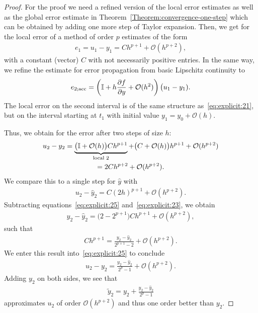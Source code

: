 \begin{proof}
  For the proof we need a refined version of the local error estimates
  as well as the global error estimate in
  Theorem~\eqref{Theorem:convergence-one-step} which can be obtained by
  adding one more step of Taylor expansion. Then, we get for the local
  error of a method of order $p$ estimates of the form
  \begin{gather}
    \label{eq:explicit:21}
    e_1 = u_1 - y_1 = C h^{p+1} + \mathcal O(h^{p+2}),
  \end{gather}
  with a constant (vector) $C$ with not necessarily positive
  entries. In the same way, we refine the estimate for error
  propagation from basic Lipschitz continuity to
  \begin{gather}
    \label{eq:explicit:22}
    e_{2;\text{acc}} = \left( \mathbb I + h \frac{\partial f}{\partial y} +
      \mathcal O(h^2)\right) \bigl(u_1-y_1).
  \end{gather}
  The local error on the second interval is of the same structure
  as~\eqref{eq:explicit:21}, but on the interval starting at $t_1$
  with initial value $y_1 = y_0 + \mathcal O(h)$.

  Thus, we obtain for the error after two steps of size $h$:
  \begin{multline}
    \label{eq:explicit:25}
    u_2-y_2
    = \underbrace{\bigl(\mathbb I + \mathcal O(h)\bigr) C
      h^{p+1}}_{\text{local 2}}
    + \bigl(C+\mathcal O(h)\bigr) h^{p+1} + \mathcal
      O(h^{p+2})
    \\  = 2C h^{p+2} + \mathcal O(h^{p+2}).
  \end{multline}
  We compare this to a single step for $\hat y$ with
  \begin{gather}
    \label{eq:explicit:23}
    u_2 - \hat y_2 = C (2h)^{p+1} + \mathcal O(h^{p+2}).
  \end{gather}
  Subtracting equations~\eqref{eq:explicit:25}
  and~\eqref{eq:explicit:23}, we obtain
  \begin{gather*}
    y_2 - \hat y_2 = \bigl(2-2^{p+1}\bigr)C h^{p+1} + \mathcal O(h^{p+2}),
  \end{gather*}
  such that
  \begin{gather}
    \label{eq:explicit:26}
    C h^{p+1} = \frac{y_2 - \hat y_2}{2^{p+1}-2} + \mathcal O(h^{p+2}).
  \end{gather}
  We enter this result into~\eqref{eq:explicit:25} to conclude
  \begin{gather}
    \label{eq:explicit:27}
    u_2 - y_2 = \frac{y_2 - \hat y_2}{2^{p}-1} + \mathcal O(h^{p+2}).
  \end{gather}
  Adding $y_2$ on both sides, we see that
  \begin{gather}
    \label{eq:explicit:28}
    \tilde y_2 = y_2 + \frac{y_2 - \hat y_2}{2^{p}-1}
  \end{gather}
  approximates $u_2$ of order $\mathcal O(h^{p+2})$ and thus one order
  better than $y_2$.
\end{proof}

